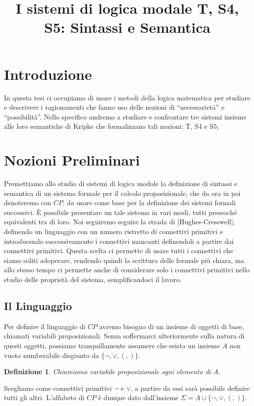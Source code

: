 \documentclass[a4paper, 12pt]{article}
\title{I sistemi di logica modale T, S4, S5: Sintassi e Semantica}
\date{}
\newtheorem{definition}{Definizione}
\begin{document}
\maketitle
\section{Introduzione}
In questa tesi ci occupiamo di usare i metodi della logica matematica
per studiare e descrivere i ragionamenti che fanno uso delle nozioni
di ``necessarietà'' e ``possibilità''. Nello specifico andremo a studiare
e confrontare tre sistemi insieme alle loro semantiche di Kripke
che formalizzano tali nozioni: T, S4 e S5;

\section{Nozioni Preliminari}
Premettiamo allo studio di sistemi di logica modale la definizione
di sintassi e semantica di un sistema formale per il calcolo proposizionale,
che da ora in poi denoteremo con $CP$, da usare come base per la definizione
dei sistemi formali successivi.
È possibile presentare un tale sistema in vari modi, tutti pressoché equivalenti tra di loro.
Noi seguiremo seguire la strada di [Hughes-Cresswell], definendo un linguaggio con un numero ristretto
di connettivi primitivi e introducendo successivamente i connettivi mancanti definendoli a partire
dai connettivi primitivi.
Questa scelta ci permette di usare tutti i connettivi che siamo soliti adoperare,
rendendo quindi la scrittura delle formule più chiara, ma allo stesso tempo ci permette anche di
considerare solo i connettivi primitivi nello studio delle proprietà del sistema,
semplificandoci il lavoro.

\subsection{Il Linguaggio}
Per definire il linguaggio di $CP$ avremo bisogno di un insieme di oggetti di base,
chiamati variabili proposizionali. Senza soffermarci ulteriormente sulla natura di questi oggetti,
possiamo tranquillamente assumere che esista un insieme $A$ non vuoto numberabile
disgiunto da $\{\neg, \lor, (, )\}$.

\begin{definition}
Chiamiamo variabile proposizionale ogni elemento di $A$.
\end{definition}

Scegliamo come connettivi primitivi $\neg$ e $\lor$,
a partire da essi sarà possibile definire tutti gli altri.
L'alfabeto di $CP$ è dunque dato dall'insieme $\Sigma = A \cup \{\neg, \lor, (, )\}$.
\end{document}
